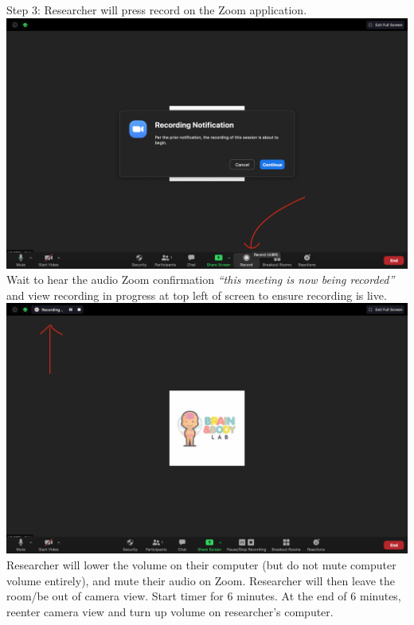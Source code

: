 \documentclass[]{book}
\begin{document}
Step 3:
Researcher will press record on the Zoom application.\includegraphics{images/zoom_parent_child_interaction/3.png} Wait to hear the audio Zoom confirmation \emph{``this meeting is now being recorded''} and view recording in progress at top left of screen to ensure recording is live. \includegraphics{images/zoom_parent_child_interaction/4.png} Researcher will lower the volume on their computer (but do not mute computer volume entirely), and mute their audio on Zoom. Researcher will then leave the room/be out of camera view. Start timer for 6 minutes. At the end of 6 minutes, reenter camera view and turn up volume on researcher's computer.
\end{document}
